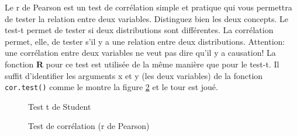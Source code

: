 \documentclass[10.5pt,a4paper]{article}
\newcommand{\rcode}[1]{\texttt{\color{rstudio} #1}}
\begin{document}
  Le r de Pearson est un test de corrélation simple et pratique qui vous permettra de tester la relation entre deux variables. Distinguez bien les deux concepts. Le test-t permet de tester si deux distributions sont différentes. La corrélation permet, elle, de tester s'il y a une relation entre deux distributions. Attention: une corrélation entre deux variables ne veut pas dire qu'il y a causation! La fonction \textbf{R} pour ce test est utilisée de la même manière que pour le test-t. Il suffit d'identifier les arguments x et y (les deux variables) de la fonction \rcode{cor.test()} comme le montre la figure \ref{anaPearCorr} et le tour est joué.
  
  \begin{figure}[H]
    \centering
    \caption{Test t de Student}
    \label{anaTtest}
    \end{figure}
    
    \begin{figure}[H]
    \centering
    \caption{Test de corrélation (r de Pearson)}
    \label{anaPearCorr}
    \end{figure}
  
\end{document}
